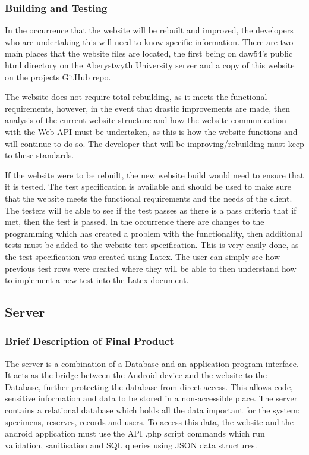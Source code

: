     \subsubsection{Building and Testing}
        In the occurrence that the website will be rebuilt and improved, the developers who are undertaking this will need to know specific information. There are two main places that the website files are located, the first being on daw54's public html directory on the Aberystwyth University server and a copy of this website on the projects GitHub repo. 
    
        The website does not require total rebuilding, as it meets the functional requirements, however, in the event that drastic improvements are made, then analysis of the current website structure and how the website communication with the Web API must be undertaken, as this is how the website functions and will continue to do so. The developer that will be improving/rebuilding must keep to these standards.
    
        If the website were to be rebuilt, the new website build would need to ensure that it is tested. The test specification is available and should be used to make sure that the website meets the functional requirements and the needs of the client. The testers will be able to see if the test passes as there is a pass criteria that if met, then the test is passed. In the occurrence there are changes to the programming which has created a problem with the functionality, then additional tests must be added to the website test specification. This is very easily done, as the test specification was created using Latex. The user can simply see how previous test rows were created where they will be able to then understand how to implement a new test into the Latex document. 

\subsection{Server}
    \subsubsection{Brief Description of Final Product}
        The server is a combination of a Database and an application program interface. It acts as the bridge between the Android device and the website to the Database, further protecting the database from direct access. This allows code, sensitive information and data to be stored in a non-accessible place. The server contains a relational database which holds all the data important for the system: specimens, reserves, records and users. To access this data, the website and the android application must use the API .php script commands which run validation, sanitisation and SQL queries using JSON data structures. 

